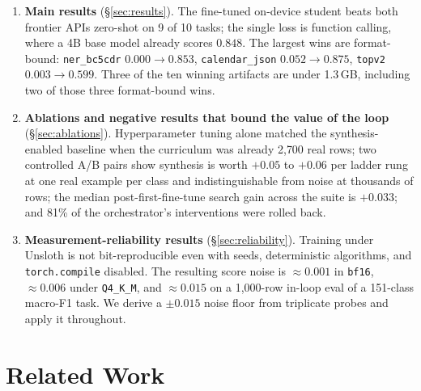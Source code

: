 \documentclass[sigconf,10pt]{acmart}
\newcommand{\xref}[1]{\S\ref{#1}}
\newcommand{\tsk}[1]{\texttt{#1}}
\begin{document}
\begin{enumerate}[leftmargin=*,itemsep=2pt]
\item \textbf{Main results} (\xref{sec:results}). The fine-tuned on-device student beats both
frontier APIs zero-shot on 9 of 10 tasks; the single loss is function calling, where a 4B
base model already scores $0.848$. The largest wins are format-bound: \tsk{ner\_bc5cdr}
$0.000\to0.853$, \tsk{calendar\_json} $0.052\to0.875$, \tsk{topv2} $0.003\to0.599$.
Three of the ten winning artifacts are under 1.3\,GB, including two of those three
format-bound wins.

\item \textbf{Ablations and negative results that bound the value of the loop}
(\xref{sec:ablations}). Hyperparameter tuning alone matched the synthesis-enabled baseline
when the curriculum was already 2{,}700 real rows; two controlled A/B pairs show synthesis is
worth $+0.05$ to $+0.06$ per ladder rung at one real example per class and indistinguishable
from noise at thousands of rows; the median post-first-fine-tune search gain across the suite
is $+0.033$; and 81\% of the orchestrator's interventions were rolled back.

\item \textbf{Measurement-reliability results} (\xref{sec:reliability}). Training under
Unsloth is not bit-reproducible even with seeds, deterministic algorithms, and
\texttt{torch.compile} disabled. The resulting score noise is $\approx0.001$ in
\texttt{bf16}, $\approx0.006$ under \texttt{Q4\_K\_M}, and $\approx0.015$ on a 1{,}000-row
in-loop eval of a 151-class macro-F1 task. We derive a $\pm0.015$ noise floor from
triplicate probes and apply it throughout.
\end{enumerate}

\section{Related Work}
\label{sec:related}
\end{document}
